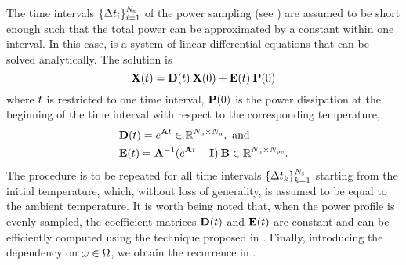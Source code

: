 The time intervals $\{ \Delta t_i \}_{i = 1}^{N_\text{s}}$ of the power sampling (see ) are assumed to be short enough such that the total power can be approximated by a constant within one interval. In this case,  is a system of linear differential equations that can be solved analytically. The solution is \cite{ukhov2012}
\begin{equation} \elabel{ode-solution}
  \vX(\t) = \mCF(\t) \: \vX(0) + \mCS(\t) \: \vP(0)
\end{equation}
where $t$ is restricted to one time interval, $\mathbf{P}(0)$ is the power dissipation at the beginning of the time interval with respect to the corresponding temperature,
\begin{align*}
  & \mCF(\t) = e^{\mA \t} \in \real^{\nodes \times \nodes}, \text{ and} \\
  & \mCS(\t) = \mA^{-1} (e^{\mA \t} - \mI) \: \mB \in \real^{\nodes \times \cores}.
\end{align*}
The procedure is to be repeated for all time intervals $\{ \Delta t_k \}_{k=1}^{N_\text{s}}$ starting from the initial temperature, which, without loss of generality, is assumed to be equal to the ambient temperature. It is worth being noted that, when the power profile is evenly sampled, the coefficient matrices $\mCF(\t)$ and $\mCS(\t)$ are constant and can be efficiently computed using the technique proposed in \cite{ukhov2012}.  Finally, introducing the dependency on $\omega \in \Omega$, we obtain the recurrence in .

